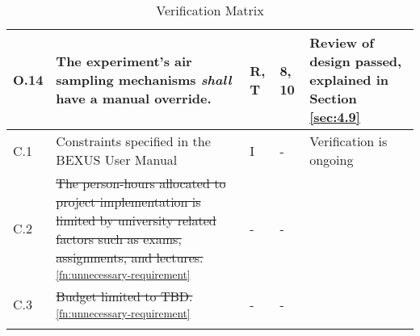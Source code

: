 \begin{longtable}[]{|m{}| m{} |m{} |m{}|m{}|}
O.14 & The experiment's air sampling mechanisms \textit{shall} have a manual override.                                                           &      R, T        & 8, 10            &    Review of design passed, explained in Section \ref{sec:4.9}    \\ \hline
C.1  & Constraints specified in the BEXUS User Manual                                                                                                                          &       I       & -            & Verification is ongoing     \\ \hline
C.2  & \st{The person-hours allocated to project implementation is limited by university related factors such as exams, assignments, and lectures.} \textsuperscript{\ref{fn:unnecessary-requirement}}                                &      -        & -            &        \\ \hline
C.3  & \st{Budget limited to TBD.} \textsuperscript{\ref{fn:unnecessary-requirement}}                                                                                                                                                 &      -        & -            &        \\ \hline

\caption{Verification Matrix}
\label{tab:var-mat}
\end{longtable}
\raggedbottom